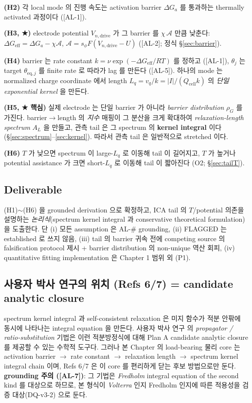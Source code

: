 \documentclass[11pt,a4paper]{article}
\newcommand{\eff}{\mathrm{eff}}
\newcommand{\eq}{\mathrm{eq}}
\newcommand{\dimedrive}{\mathrm{drive}}
\newcommand{\cell}{\mathrm{cell}}
\newcommand{\AL}[1]{\textsf{[AL-#1]}}
\begin{document}
\textbf{(H2)} 각 local mode 의 진행 속도는 activation barrier $\Delta G_{a}$ 를 통과하는
thermally activated 과정이다 (\AL{1}).

\textbf{(H3, ★)} electrode potential $V_{n,\dimedrive}$ 가 그 barrier 를 $\chi\,\mathcal A$
만큼 낮춘다: $\Delta G_\eff = \Delta G_a - \chi\mathcal A$, $\mathcal A=s_\phi F(V_{n,\dimedrive}-U)$
(\AL{2}; 정식 \S\ref{sec:barrier}).

\textbf{(H4)} barrier 는 rate constant $k=\nu\exp(-\Delta G_\eff/RT)$ 를 정하고 (\AL{1}),
$\theta_j$ 는 target $\theta_{\eq,j}$ 를 finite rate 로 따라가 lag 를 만든다 (\AL{5}).
하나의 mode 는 normalized charge coordinate 에서 length $L_q=v_q/k=|I|/(Q_\cell k)$ 의 \emph{단일 exponential kernel} 을 만든다.

\textbf{(H5, ★ 핵심)} 실제 electrode 는 단일 barrier 가 아니라 \emph{barrier
distribution} $\rho_G$ 를 가진다. barrier$\to$length 의 \emph{지수} 매핑이 그 분산을
크게 확대하여 \emph{relaxation-length spectrum} $A_L$ 을 만들고, 관측 tail 은 그 spectrum
의 \textbf{kernel integral} 이다 (\S\ref{sec:spectrum}--\ref{sec:kernel}). 따라서 관측
tail 은 일반적으로 stretched 이다.

\textbf{(H6)} $T$ 가 낮으면 spectrum 이 large-$L_q$ 로 이동해 tail 이 길어지고, $T$ 가
높거나 potential assistance 가 크면 short-$L_q$ 로 이동해 tail 이 짧아진다 (O2; \S\ref{sec:tailT}).

\subsection{Deliverable}\label{sec:deliverable}
(H1)$\sim$(H6) 을 grounded derivation 으로 확정하고, ICA tail 의 $T$/potential 의존을
설명하는 \emph{논리식}(spectrum kernel integral 과 conservative theoretical formulation)을 도출한다. 단 (i) 모든 assumption 은 AL-\# grounding, (ii) FLAGGED 는 established
로 쓰지 않음, (iii) tail 의 barrier 귀속 전에 competing source 의 falsification protocol
제시 + barrier distribution 의 non-unique 역산 회피, (iv) quantitative fitting implementation 은 Chapter 1 범위 외 (P1).

\subsection{사용자 박사 연구의 위치 (Refs 6/7) = candidate analytic closure}\label{sec:phd}
spectrum kernel integral 과 self-consistent relaxation 은 미지 함수가 적분 안팎에 동시에
나타나는 integral equation 을 만든다. 사용자 박사 연구 \cite{lee2011,son2013} 의
\emph{propagator / ratio-substitution} 기법은 이런 적분방정식에 대해 Plan A candidate analytic
closure 를 제공할 수 있는 수학적 도구다. 그러나 본 Chapter 의 load-bearing 물리 core 는
activation barrier $\to$ rate constant $\to$ relaxation length $\to$ spectrum kernel integral
chain 이며, Refs 6/7 은 이 core 를 편리하게 닫는 후보 방법으로만 둔다. \textbf{grounding 주의
(\AL{7})}: 그 기법은 \emph{Fredholm} integral equation of the second kind 를 대상으로
하므로, 본 형식이 \emph{Volterra} 인지 Fredholm 인지에 따른 적용성을 검증 대상(DQ-v3-2)
으로 둔다.
\end{document}
